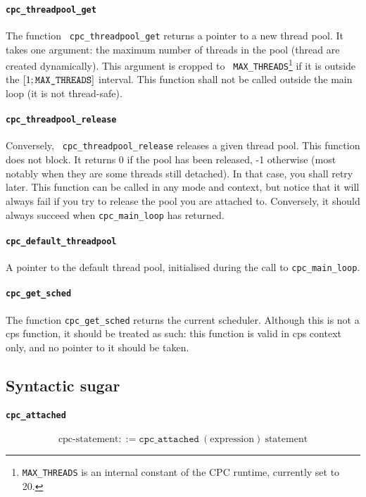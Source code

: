 \documentclass[a4paper]{report}
\begin{document}
\paragraph{\tt cpc\_threadpool\_get} The function {\tt
cpc\_threadpool\_get} returns a pointer to a new thread pool.  It takes
one argument: the maximum number of threads in the pool (thread are
created dynamically).  This argument is cropped to {\tt
MAX\_THREADS}\footnote{{\tt MAX\_THREADS} is an internal constant of the
CPC runtime, currently set to 20.} if it is outside the $[ 1; 
\mbox{\tt MAX\_THREADS} ]$ interval.  This function shall not be
called outside the main loop (it is not thread-safe).

\paragraph{\tt cpc\_threadpool\_release} Conversely, {\tt
cpc\_threadpool\_release} releases a given thread pool.  This function
does not block.  It returns 0 if the pool has been released, -1
otherwise (most notably when they are some threads still detached).  In
that case, you shall retry later.
This function can be called in any mode and context, but notice that it
will always fail if you try to release the pool you are attached to.
Conversely, it should always succeed when {\tt cpc\_main\_loop} has
returned.

\paragraph{\tt cpc\_default\_threadpool} A pointer to the default thread pool,
initialised during the call to {\tt cpc\_main\_loop}.

\paragraph{\tt cpc\_get\_sched} The function {\tt cpc\_get\_sched} returns
the current scheduler.  Although this is not a cps function, it should
be treated as such: this function is valid in cps context only, and no
pointer to it should be taken.

\subsection*{Syntactic sugar}
\paragraph{\tt cpc\_attached}
\[ \mbox{cpc-statement} ::=
   \mathtt{cpc\_attached}\ (\mbox{expression})\ \mbox{statement} \]
\end{document}
